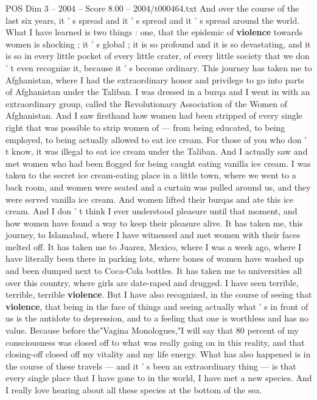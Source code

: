 \begin{textsample}{POS Dim 3 – 2004 – Score 8.00 – 2004/t000464.txt}
And over the course of the last six years, it ' s spread and it ' s spread and it ' s spread around the world.
What I have learned is two things : one, that the epidemic of \textbf{violence} towards women is shocking ; it ' s global ; it is so profound and it is so devastating, and it is so in every little pocket of every little crater, of every little society that we don ' t even recognize it, because it ' s become ordinary.
This journey has taken me to Afghanistan, where I had the extraordinary honor and privilege to go into parts of Afghanistan under the Taliban.
I was dressed in a burqa and I went in with an extraordinary group, called the Revolutionary Association of the Women of Afghanistan.
And I saw firsthand how women had been stripped of every single right that was possible to strip women of — from being educated, to being employed, to being actually allowed to eat ice cream.
For those of you who don ' t know, it was illegal to eat ice cream under the Taliban.
And I actually saw and met women who had been flogged for being caught eating vanilla ice cream.
I was taken to the secret ice cream-eating place in a little town, where we went to a back room, and women were seated and a curtain was pulled around us, and they were served vanilla ice cream.
And women lifted their burqas and ate this ice cream.
And I don ' t think I ever understood pleasure until that moment, and how women have found a way to keep their pleasure alive.
It has taken me, this journey, to Islamabad, where I have witnessed and met women with their faces melted off.
It has taken me to Juarez, Mexico, where I was a week ago, where I have literally been there in parking lots, where bones of women have washed up and been dumped next to Coca-Cola bottles.
It has taken me to universities all over this country, where girls are date-raped and drugged.
I have seen terrible, terrible, terrible \textbf{violence}.
But I have also recognized, in the course of seeing that \textbf{violence}, that being in the face of things and seeing actually what ' s in front of us is the antidote to depression, and to a feeling that one is worthless and has no value.
Because before the"Vagina Monologues,"I will say that 80 percent of my consciousness was closed off to what was really going on in this reality, and that closing-off closed off my vitality and my life energy.
What has also happened is in the course of these travels — and it ' s been an extraordinary thing — is that every single place that I have gone to in the world, I have met a new species.
And I really love hearing about all these species at the bottom of the sea.

\end{textsample}
